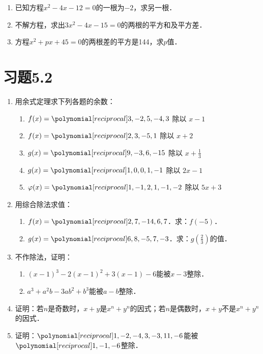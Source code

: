 \begin{ex}
\begin{enumerate}
    \item 已知方程$x^2-4x-12=0$的一根为$-2$，求另一根．
    \item 不解方程，求出$3x^2-4x-15=0$的两根的平方和及平方差．
    \item 方程$x^2+px+45=0$的两根差的平方是144，求$p$值．
\end{enumerate}
\end{ex}

\section*{习题5.2}

\begin{enumerate}
    \item 用余式定理求下列各题的余数：
\begin{enumerate}
    \item $f(x)=\poly{3,-2,5,-4,3}$ 除以 $x-1$
    \item $f(x)=\poly{2,3,-5,1}$ 除以 $x+2$
    \item $g(x)=\poly{9,-3,6,-15}$ 除以 $x+\frac{1}{3}$
    \item $g(x)=\poly{1,0,0,1,-1}$ 除以 $2x-1$
    \item $\varphi(x)=\poly{1,-1,2,1,-1,-2}$ 除以 $5x+3$
\end{enumerate}    
    
\item 用综合除法求值：
\begin{enumerate}
    \item $f(x)=\poly{2,7,-14,6,7}$．求：$f(-5)$．
    \item $g(x)=\poly{6,8,-5,7,-3}$．求：$g\left(\frac{2}{3}\right)$的值．
\end{enumerate}

\item 不作除法，证明：
\begin{enumerate}
    \item $(x-1)^3-2(x-1)^2+3(x-1)-6$能被$x-3$整除．
    \item $a^3+a^2b-3ab^2+b^3$能被$a-b$整除．
\end{enumerate}

\item 证明：若$n$是奇数时，$x+y$是$x^n+y^n$的因式；若$n$是偶数时，$x+y$不是$x^n+y^n$的因式．

\item 证明：$\poly{1,-2,-4,3,-3,11,-6}$能被$\poly{1,-1,-6}$整除．


\end{enumerate}
